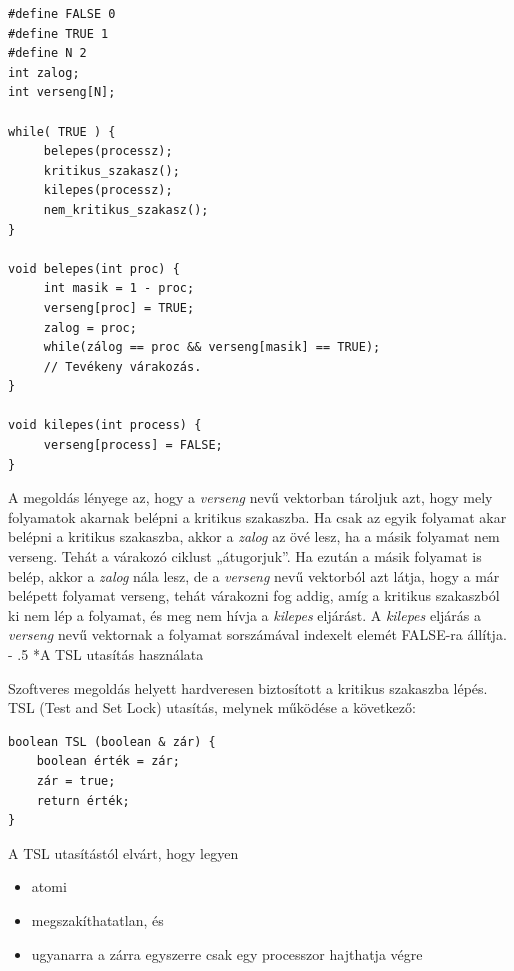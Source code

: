 \documentclass[tikz,12pt,margin=0px]{article}
\makeatletter
\renewcommand\paragraph{%
	\@startsection{paragraph}{4}{0mm}%
	{-\baselineskip}%
	{.5\baselineskip}%
	{\normalfont\normalsize\bfseries}}
\makeatother
\begin{document}
   \begin{verbatim}
#define FALSE 0
#define TRUE 1
#define N 2
int zalog;
int verseng[N];

while( TRUE ) {
     belepes(processz);
     kritikus_szakasz();
     kilepes(processz);
     nem_kritikus_szakasz();
}

void belepes(int proc) {
     int masik = 1 - proc;
     verseng[proc] = TRUE;
     zalog = proc;
     while(zálog == proc && verseng[masik] == TRUE);
     // Tevékeny várakozás.
}

void kilepes(int process) {
     verseng[process] = FALSE;
}\end{verbatim}

    \noindent A megoldás lényege az, hogy a \emph{verseng} nevű vektorban tároljuk azt, hogy mely folyamatok akarnak belépni a kritikus szakaszba. Ha csak az egyik folyamat akar belépni a kritikus szakaszba, akkor a \emph{zalog} az övé lesz, ha a másik folyamat nem verseng. Tehát a várakozó ciklust „átugorjuk”. Ha ezután a másik folyamat is belép, akkor a \emph{zalog} nála lesz, de a \emph{verseng} nevű vektorból azt látja, hogy a már belépett folyamat verseng, tehát várakozni fog addig, amíg a kritikus szakaszból ki nem lép a folyamat, és meg nem hívja a \emph{kilepes} eljárást. A \emph{kilepes} eljárás a \emph{verseng} nevű vektornak a folyamat sorszámával indexelt elemét FALSE-ra állítja.\\

    \paragraph*{A TSL utasítás használata}

    Szoftveres megoldás helyett hardveresen biztosított a kritikus szakaszba lépés.\\

    \noindent TSL (Test and Set Lock) utasítás, melynek működése a következő:
    \begin{verbatim}
boolean TSL (boolean & zár) {
    boolean érték = zár;
    zár = true;
    return érték;
}
    \end{verbatim}

    \noindent A TSL utasítástól elvárt, hogy legyen
        \begin{itemize}
            \item atomi
            \item megszakíthatatlan, és
            \item ugyanarra a zárra egyszerre csak egy processzor hajthatja végre
        \end{itemize}
\end{document}
